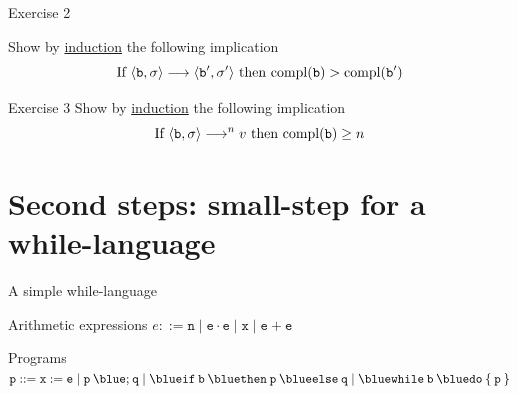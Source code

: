 \documentclass{beamer}
\begin{document}
\begin{frame}{Exercise 2}

        Show by \alert{\underline{induction}} the following 
        implication
        \[
                \text{If } \langle \mathtt{b}, \sigma \rangle \longrightarrow \langle \mathtt{b}', \sigma' \rangle 
                \text{ then }
                \mathrm{compl}(\mathtt{b}) > \mathrm{compl}(\mathtt{b}')
       \]
\end{frame}

\begin{frame}{Exercise 3}
        Show by \alert{\underline{induction}} the following 
        implication
        \[
                \text{If } \langle \mathtt{b}, \sigma \rangle \longrightarrow^n v 
                \text{ then }
                \mathrm{compl}(\mathtt{b}) \geq n 
       \]
\end{frame}

\section{Second steps: small-step for a while-language}

\begin{frame}{A simple while-language}

        \vspace{0.7cm}
	\begin{block}{Arithmetic expressions}
	$e ::=  \mathtt{n}  \mid \mathtt{e \cdot e}
        \mid  \mathtt{x}  \mid \mathtt{e + e}$
	\end{block}

	\vspace{0.7cm}
	\begin{block}{Programs}
        $\prog{p} ::= \mathtt{x} := \mathtt{e} \mid
	\mathtt{p \> {\blue ;} \> q} \mid
	\mathtt{{\blue if} \> b \> {\blue then} \> p \> {\blue else} \> q} \mid
	\mathtt{{\blue while} \> b \> {\blue do} \> \{ \> p \> \}}$
	\end{block}

\end{frame}
\end{document}
